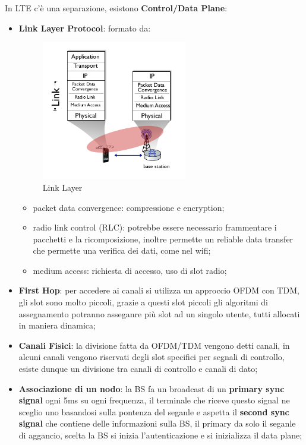 \documentclass[12pt]{article}
\begin{document}
In LTE c'\`e una separazione, esistono \textbf{Control/Data Plane}:
\begin{itemize}
    \item \textbf{Link Layer Protocol}: formato da:
        \begin{figure}[H]
            \centering
            \includegraphics[width=0.6\textwidth]{link-layer.png}
            \caption{Link Layer}
            \label{fig:link-layer}
        \end{figure}
        \begin{itemize}
            \item packet data convergence: compressione e encryption;
            \item radio link control (RLC): potrebbe essere necessario frammentare i pacchetti e la ricomposizione, inoltre permette un reliable data transfer che permette una verifica dei dati, come nel wifi;
            \item medium access: richiesta di accesso, uso di slot radio;
        \end{itemize}
    \item \textbf{First Hop}: per accedere ai canali si utilizza un approccio OFDM con TDM, gli slot sono molto piccoli, grazie a questi slot piccoli gli algoritmi di assegnamento potranno asseganre pi\`u slot ad un singolo utente, tutti allocati in maniera dinamica;
    \item \textbf{Canali Fisici}: la divisione fatta da OFDM/TDM vengono detti canali, in alcuni canali vengono riservati degli slot specifici per segnali di controllo, esiste dunque un divisione tra canali di controllo e canali di dato;
    \item \textbf{Associazione di un nodo}: la BS fa un broadcast di un \textbf{primary sync signal} ogni 5ms su ogni frequenza, il terminale che riceve questo signal ne sceglio uno basandosi sulla pontenza del seganle e aspetta il \textbf{second sync signal} che contiene delle informazioni sulla BS, il primary da solo il seganle di aggancio, scelta la BS si inizia l'autenticazione e si inizializza il data plane;

\end{itemize}
\end{document}
